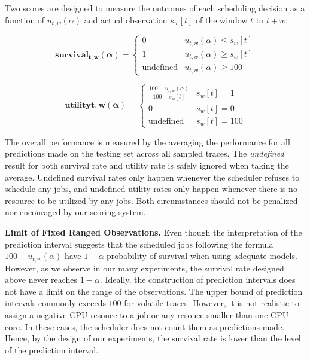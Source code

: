 \documentclass[sigplan,10pt,review,anonymous]{acmart}
\begin{document}
Two scores are designed to measure the outcomes of each scheduling decision as a
function of $u_{t, w}(\alpha)$ and actual observation $s_w[t]$ of the window $t$
to $t + w$:

\begin{equation}
    \mathbf{survival_{t, w}(\alpha)} =
    \begin{cases}
    0 & u_{t, w}(\alpha) \leq s_w[t] \\
    1 & u_{t, w}(\alpha) \geq s_w[t] \\
    \text{undefined} & u_{t, w}(\alpha) \geq 100
    \end{cases}
\end{equation}

\begin{equation}
    \mathbf{utility{t, w}(\alpha)} =
   \begin{cases} 
    \frac{100 - u_{t, w}(\alpha)}{100 - s_w[t]} & s_w[t] = 1  \\
    0 & s_w[t] = 0 \\
    \text{undefined} & s_w[t] = 100
   \end{cases}
\end{equation}

The overall performance is measured by the averaging the performance for all
predictions made on the testing set across all sampled traces. The
\textit{undefined} result for both survival rate and utility rate is safely
ignored when taking the average. Undefined survival rates only happen whenever
the scheduler refuses to schedule any jobs, and undefined utility rates only
happen whenever there is no resource to be utilized by any jobs. Both
circumstances should not be penalized nor encouraged by our scoring system. 

\textbf{Limit of Fixed Ranged Observations.} Even though the interpretation of
the prediction interval suggests that the scheduled jobs following the formula
$100 - u_{t,w}(\alpha)$ have $1 - \alpha$ probability of survival when using
adequate models. However, as we observe in our many experiments, the survival
rate designed above never reaches $1 - \alpha$. Ideally, the construction of
prediction intervals does not have a limit on the range of the observations. The
upper bound of prediction intervals commonly exceeds $100$ for volatile traces.
However, it is not realistic to assign a negative CPU resouce to a job or any
resouce smaller than one CPU core. In these cases, the scheduler does not count
them as predictions made. Hence, by the design of our experiments, the survival
rate is lower than the level of the prediction interval.
\end{document}
